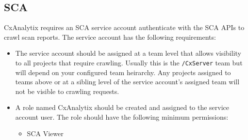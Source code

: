 \subsection{SCA}

CxAnalytix requires an SCA service account authenticate with the SCA APIs to crawl scan reports. The service account has the following requirements:

\begin{itemize}
    \item The service account should be assigned at a team level that allows visibility to all projects that require crawling. 
    Usually this is the \verb|/CxServer|
    team but will depend on your configured team heirarchy. Any projects assigned to teams above or at a sibling level of the service account's assigned team 
    will not be visible to crawling requests.

    \item A role named CxAnalytix should be created and assigned to the service account user. The role should have the following minimum permissions:
    \begin{itemize}
        \item SCA Viewer
    \end{itemize}

\end{itemize}

